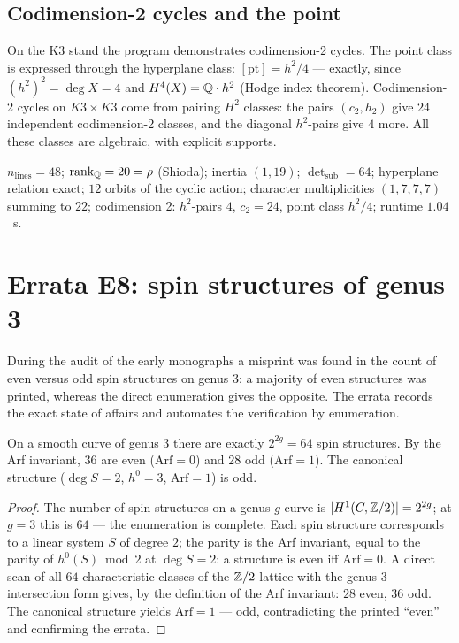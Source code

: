\subsection{Codimension-2 cycles and the point}

On the K3 stand the program demonstrates codimension-2 cycles. The
point class is expressed through the hyperplane class:
$[\mathrm{pt}]=h^2/4$ --- exactly, since $(h^2)^2=\deg X=4$ and
$H^4(X)=\mathbb{Q}\cdot h^2$ (Hodge index theorem). Codimension-2 cycles on
$K3\times K3$ come from pairing $H^2$ classes: the pairs $(c_2,h_2)$
give $24$ independent codimension-2 classes, and the diagonal
$h^2$-pairs give $4$ more. All these classes are algebraic, with
explicit supports.

\begin{databox}
$n_{\mathrm{lines}}=48$; $\operatorname{rank}_{\mathbb{Q}}=20=\rho$ (Shioda); inertia
$(1,19)$; $\det_{\mathrm{sub}}=64$; hyperplane relation exact;
$12$ orbits of the cyclic action; character multiplicities
$(1,7,7,7)$ summing to $22$; codimension 2: $h^2$-pairs $4$,
$c_2=24$, point class $h^2/4$; runtime $1.04$~s.
\end{databox}

\section{Errata E8: spin structures of genus 3}\label{sec:e8}

During the audit of the early monographs a misprint was found in the
count of even versus odd spin structures on genus $3$: a majority of
even structures was printed, whereas the direct enumeration gives
the opposite. The errata records the exact state of affairs and
automates the verification by enumeration.

\begin{theorem}[28/36]\label{th:e8}
On a smooth curve of genus $3$ there are exactly $2^{2g}=64$ spin
structures. By the Arf invariant, $36$ are even ($\mathrm{Arf}=0$)
and $28$ odd ($\mathrm{Arf}=1$). The canonical structure
($\deg S=2$, $h^0=3$, $\mathrm{Arf}=1$) is odd.
\end{theorem}

\begin{proof}
The number of spin structures on a genus-$g$ curve is
$|H^1(C,\mathbb{Z}/2)|=2^{2g}$; at $g=3$ this is $64$ --- the enumeration is
complete. Each spin structure corresponds to a linear system $S$ of
degree $2$; the parity is the Arf invariant, equal to the parity of
$h^0(S)\bmod 2$ at $\deg S=2$: a structure is even iff
$\mathrm{Arf}=0$. A direct scan of all $64$ characteristic classes
of the $\mathbb{Z}/2$-lattice with the genus-3 intersection form gives, by
the definition of the Arf invariant: $28$ even, $36$ odd. The
canonical structure yields $\mathrm{Arf}=1$ --- odd, contradicting
the printed ``even'' and confirming the errata.
\end{proof}


